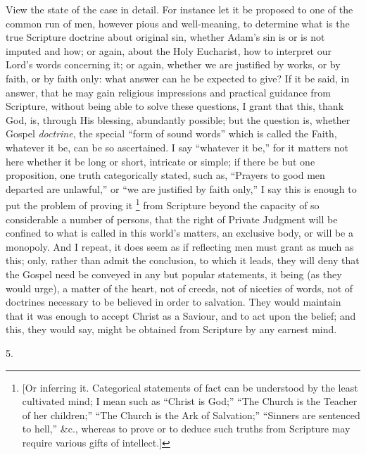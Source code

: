 View the state of the case in detail. For instance let it be
proposed to one of the common run of men, however pious and
well-meaning, to determine what is the true Scripture doctrine about
original sin, whether Adam's sin is or is not imputed and how; or
again, about the Holy Eucharist, how to interpret our Lord's words
concerning it; or again, whether we are justified by works, or by
faith, or by faith only: what answer can he be expected to give? If it
be said, in answer, that he may gain religious impressions and
practical guidance from Scripture, without being able to solve these
questions, I grant that this, thank God, is, through His blessing,
abundantly possible; but the question is, whether Gospel \emph{doctrine},
the special ``form of sound words'' which is called the Faith,
whatever it be, can be so ascertained. I say ``whatever it
be,'' for it matters not here whether it be long or short,
intricate or simple; if there be but one proposition, one truth
categorically stated, such as, ``Prayers to good men departed are
unlawful,'' or ``we are justified by faith only,'' I say
this is enough to put the problem of proving it \footnote{[Or inferring it. Categorical statements of fact can be
understood by the least cultivated mind; I mean such as ``Christ
is God;'' ``The Church is the Teacher of her children;''
``The Church is the Ark of Salvation;'' ``Sinners are
sentenced to hell,'' \&c., whereas to prove or to deduce such
truths from Scripture may require various gifts of intellect.]} from Scripture beyond the capacity of so considerable a number
of persons, that the right of Private Judgment will be confined to
what is called in this world's matters, an exclusive body, or will be
a monopoly. And I repeat, it does seem as if reflecting men must grant
as much as this; only, rather than admit the conclusion, to which it
leads, they will deny that the Gospel need be conveyed in any but
popular statements, it being (as they would urge), a matter of the
heart, not of creeds, not of niceties of words, not of doctrines
necessary to be believed in order to salvation. They would maintain
that it was enough to accept Christ as a Saviour, and to act
upon the belief; and this, they would say, might be obtained from
Scripture by any earnest mind.

5.


